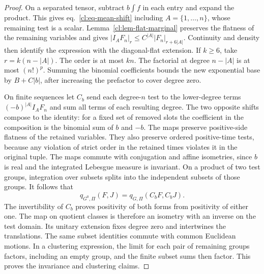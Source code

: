 \documentclass[11pt,letterpaper,reqno]{amsart}
\numberwithin{equation}{section}
\renewcommand{\eqref}[1]{\textup{eq.~\ref{#1}}}
\theoremstyle{definition}
\theoremstyle{remark}
\begin{document}
\begin{proof}
On a separated tensor, subtract \(b\int f\) in each
entry and expand the product. This gives
\eqref{cl:eq-mean-shift} including \(A=\{1,\ldots,n\}\),
whose remaining test is a scalar. Lemma~\ref{cl:lem-flat-marginal}
preserves the flatness of the remaining variables and gives
\(|I_AF_n|_r\le C^{|A|}|F_n|_{r+6|A|}\).
Continuity and density then identify the expression with
the diagonal-flat extension. If \(k\ge6\), take
\(r=k(n-|A|)\). The order is at most \(kn\).
The factorial at degree \(n-|A|\) is at most \((n!)^p\).
Summing the binomial coefficients bounds the new
exponential base by \(B+C|b|\), after increasing the
prefactor to cover degree zero.

On finite sequences let \(C_b\) send each degree-\(n\)
test to the lower-degree terms \((-b)^{|A|}I_AF_n\)
and sum all terms of each resulting degree.
The two opposite shifts compose to the identity:
for a fixed set of removed slots the coefficient in the
composition is the binomial sum of \(b\) and \(-b\).
The maps preserve positive-side flatness of the retained
variables. They also preserve ordered positive-time tests,
because any violation of strict order in the retained
times violates it in the original tuple. The maps commute
with conjugation and affine
isometries, since \(b\) is real and the integrated
Lebesgue measure is invariant. On a product of two
test groups, integration over subsets splits into the
independent subsets of those groups. It follows that
\[
 q_{G^0,\Pi}(F,J)=q_{G,\Pi}(C_bF,C_bJ).
\]
The invertibility of \(C_b\) proves positivity of both forms
from positivity of either one. The map on quotient classes
is therefore an isometry with an inverse on the test domain. Its unitary extension fixes
degree zero and intertwines the translations.
The same subset identities commute with common Euclidean
motions. In a clustering expression, the limit for each
pair of remaining groups factors, including an empty group,
and the finite subset sums then factor. This proves the
invariance and clustering claims.
\end{proof}
\end{document}

